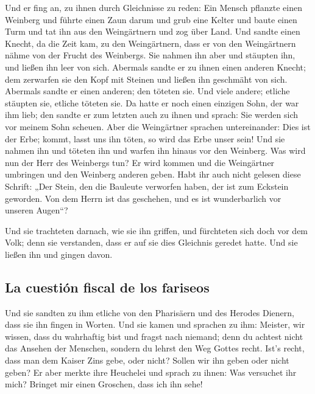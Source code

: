  Und er fing an, zu ihnen durch Gleichnisse zu reden: Ein
Mensch pflanzte einen Weinberg und führte einen Zaun darum und grub eine
Kelter und baute einen Turm und tat ihn aus den Weingärtnern und zog
über Land.  Und sandte einen Knecht, da die Zeit kam, zu
den Weingärtnern, dass er von den Weingärtnern nähme von der Frucht des
Weinbergs.  Sie nahmen ihn aber und stäupten ihn, und
ließen ihn leer von sich.  Abermals sandte er zu ihnen
einen anderen Knecht; dem zerwarfen sie den Kopf mit Steinen und ließen
ihn geschmäht von sich.  Abermals sandte er einen anderen;
den töteten sie. Und viele andere; etliche stäupten sie, etliche töteten
sie.  Da hatte er noch einen einzigen Sohn, der war ihm
lieb; den sandte er zum letzten auch zu ihnen und sprach: Sie werden
sich vor meinem Sohn scheuen.  Aber die Weingärtner
sprachen untereinander: Dies ist der Erbe; kommt, lasst uns ihn töten,
so wird das Erbe unser sein!  Und sie nahmen ihn und
töteten ihn und warfen ihn hinaus vor den Weinberg.  Was
wird nun der Herr des Weinbergs tun? Er wird kommen und die Weingärtner
umbringen und den Weinberg anderen geben.  Habt ihr auch
nicht gelesen diese Schrift: „Der Stein, den die Bauleute verworfen
haben, der ist zum Eckstein geworden.  Von dem Herrn ist
das geschehen, und es ist wunderbarlich vor unseren Augen``?

 Und sie trachteten darnach, wie sie ihn griffen, und
fürchteten sich doch vor dem Volk; denn sie verstanden, dass er auf sie
dies Gleichnis geredet hatte. Und sie ließen ihn und gingen davon.

\hypertarget{la-cuestiuxf3n-fiscal-de-los-fariseos}{%
\subsection{La cuestión fiscal de los
fariseos}\label{la-cuestiuxf3n-fiscal-de-los-fariseos}}

 Und sie sandten zu ihm etliche von den Pharisäern und
des Herodes Dienern, dass sie ihn fingen in Worten.  Und
sie kamen und sprachen zu ihm: Meister, wir wissen, dass du wahrhaftig
bist und fragst nach niemand; denn du achtest nicht das Ansehen der
Menschen, sondern du lehrst den Weg Gottes recht. Ist's recht, dass man
dem Kaiser Zins gebe, oder nicht? Sollen wir ihn geben oder nicht geben?
 Er aber merkte ihre Heuchelei und sprach zu ihnen: Was
versuchet ihr mich? Bringet mir einen Groschen, dass ich ihn sehe!


